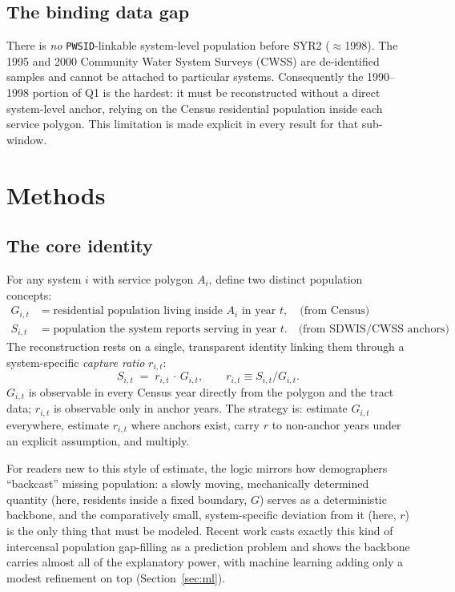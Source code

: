 \documentclass[11pt]{article}
\newcommand{\PWSID}{\texttt{PWSID}}
\newcommand{\popserved}{\ensuremath{S}}
\newcommand{\geopop}{\ensuremath{G}}
\newcommand{\ratio}{\ensuremath{r}}
\begin{document}
\subsection{The binding data gap}
There is \emph{no} \PWSID-linkable system-level population before SYR2 ($\approx$1998).
The 1995 and 2000 Community Water System Surveys (CWSS) are de-identified samples and
cannot be attached to particular systems. Consequently the 1990--1998 portion of Q1 is
the hardest: it must be reconstructed without a direct system-level anchor, relying on
the Census residential population inside each service polygon. This limitation is made
explicit in every result for that sub-window.

\section{Methods}
\label{sec:methods}

\subsection{The core identity}
For any system $i$ with service polygon $A_i$, define two distinct population concepts:
\begin{align}
\geopop_{i,t} &= \text{residential population living inside } A_i \text{ in year } t,
  \quad\text{(from Census)} \\
\popserved_{i,t} &= \text{population the system reports serving in year } t.
  \quad\text{(from SDWIS/CWSS anchors)}
\end{align}
The reconstruction rests on a single, transparent identity linking them through a
system-specific \emph{capture ratio} $\ratio_{i,t}$:
\begin{equation}
\boxed{\;\popserved_{i,t} \;=\; \ratio_{i,t}\,\cdot\,\geopop_{i,t},
\qquad \ratio_{i,t} \equiv \popserved_{i,t}/\geopop_{i,t}.\;}
\label{eq:identity}
\end{equation}
$\geopop_{i,t}$ is observable in every Census year directly from the polygon and the
tract data; $\ratio_{i,t}$ is observable only in anchor years. The strategy is:
estimate $\geopop_{i,t}$ everywhere, estimate $\ratio_{i,t}$ where anchors exist,
carry $\ratio$ to non-anchor years under an explicit assumption, and multiply.

For readers new to this style of estimate, the logic mirrors how demographers
``backcast'' missing population: a slowly moving, mechanically determined quantity
(here, residents inside a fixed boundary, $\geopop$) serves as a deterministic
backbone, and the comparatively small, system-specific deviation from it (here,
$\ratio$) is the only thing that must be modeled. Recent work casts exactly this kind
of intercensal population gap-filling as a prediction problem and shows the backbone
carries almost all of the explanatory power, with machine learning adding only a
modest refinement on top (Section~\ref{sec:ml}).
\end{document}
